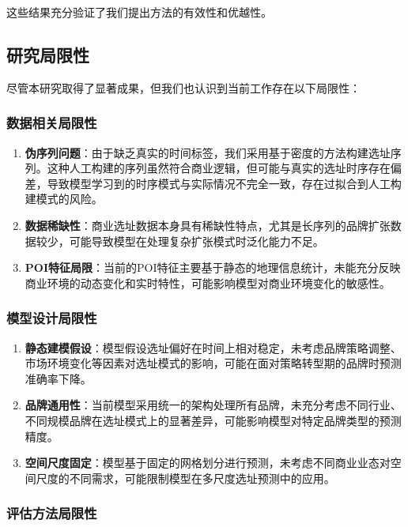 \documentclass{article}
\begin{document}
这些结果充分验证了我们提出方法的有效性和优越性。

\subsection{研究局限性}

尽管本研究取得了显著成果，但我们也认识到当前工作存在以下局限性：

\subsubsection{数据相关局限性}

\begin{enumerate}
\item \textbf{伪序列问题}：由于缺乏真实的时间标签，我们采用基于密度的方法构建选址序列。这种人工构建的序列虽然符合商业逻辑，但可能与真实的选址时序存在偏差，导致模型学习到的时序模式与实际情况不完全一致，存在过拟合到人工构建模式的风险。

\item \textbf{数据稀缺性}：商业选址数据本身具有稀缺性特点，尤其是长序列的品牌扩张数据较少，可能导致模型在处理复杂扩张模式时泛化能力不足。

\item \textbf{POI特征局限}：当前的POI特征主要基于静态的地理信息统计，未能充分反映商业环境的动态变化和实时特性，可能影响模型对商业环境变化的敏感性。
\end{enumerate}

\subsubsection{模型设计局限性}

\begin{enumerate}
\item \textbf{静态建模假设}：模型假设选址偏好在时间上相对稳定，未考虑品牌策略调整、市场环境变化等因素对选址模式的影响，可能在面对策略转型期的品牌时预测准确率下降。

\item \textbf{品牌通用性}：当前模型采用统一的架构处理所有品牌，未充分考虑不同行业、不同规模品牌在选址模式上的显著差异，可能影响模型对特定品牌类型的预测精度。

\item \textbf{空间尺度固定}：模型基于固定的网格划分进行预测，未考虑不同商业业态对空间尺度的不同需求，可能限制模型在多尺度选址预测中的应用。
\end{enumerate}

\subsubsection{评估方法局限性}
\end{document}
